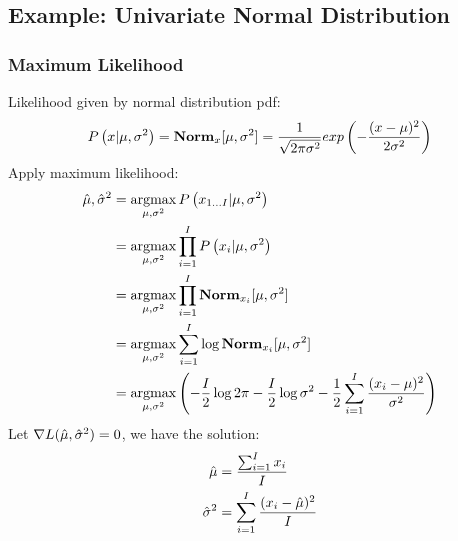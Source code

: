 \subsection{Example: Univariate Normal Distribution}

\subsubsection*{Maximum Likelihood}
Likelihood given by normal distribution pdf:
	\begin{align*}
	P\left(x|\mu,\sigma^2\right)=\mathbf{Norm}_x[\mu,\sigma^2]=\frac{1}{\sqrt{2\pi\sigma^2}}exp\left(-\frac{(x-\mu)^2}{2\sigma^2}\right)
	\end{align*}
Apply maximum likelihood:
	\begin{align*}
	\hat{\mu},\hat{\si}^2&=\argmax_{\mu,\si^2}\P{x_{1\dots I}|\mu,\si^2} \\
	&=\argmax_{\mu,\si^2}\prod_{i=1}^I\P{x_i|\mu,\si^2} \\
	&=\argmax_{\mu,\si^2}\prod_{i=1}^I\Norm_{x_i}[\mu,\si^2] \\
	&=\argmax_{\mu,\si^2}\sum_{i=1}^I\log\Norm_{x_i}[\mu,\si^2] \\
	&=\argmax_{\mu,\si^2}\left(-\frac{I}{2}\log 2\pi-\frac{I}{2}\log\si^2-\frac{1}{2}\sum_{i=1}^I\frac{(x_i-\mu)^2}{\si^2}\right)
	\end{align*}
Let $\nabla L(\hat{\mu},\hat{\sigma}^2)=0$, we have the solution:
	\begin{align*}
	\hat{\mu}&=\frac{\sum_{i=1}^Ix_i}{I} \\
	\hat{\sigma}^2&=\sum_{i=1}^I\frac{(x_i-\hat{\mu})^2}{I}
	\end{align*}

